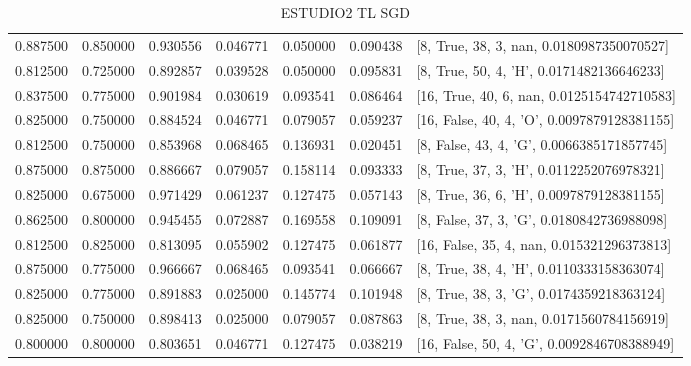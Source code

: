 \begin{table}[!htb]
{\begin{tabular}{cccc}
0.887500 & 0.850000 & 0.930556 & 0.046771 & 0.050000 & 0.090438 & [8, True, 38, 3, nan, 0.0180987350070527] \\
0.812500 & 0.725000 & 0.892857 & 0.039528 & 0.050000 & 0.095831 & [8, True, 50, 4, 'H', 0.0171482136646233] \\
0.837500 & 0.775000 & 0.901984 & 0.030619 & 0.093541 & 0.086464 & [16, True, 40, 6, nan, 0.0125154742710583] \\
0.825000 & 0.750000 & 0.884524 & 0.046771 & 0.079057 & 0.059237 & [16, False, 40, 4, 'O', 0.0097879128381155] \\
0.812500 & 0.750000 & 0.853968 & 0.068465 & 0.136931 & 0.020451 & [8, False, 43, 4, 'G', 0.0066385171857745] \\
0.875000 & 0.875000 & 0.886667 & 0.079057 & 0.158114 & 0.093333 & [8, True, 37, 3, 'H', 0.0112252076978321] \\
0.825000 & 0.675000 & 0.971429 & 0.061237 & 0.127475 & 0.057143 & [8, True, 36, 6, 'H', 0.0097879128381155] \\
0.862500 & 0.800000 & 0.945455 & 0.072887 & 0.169558 & 0.109091 & [8, False, 37, 3, 'G', 0.0180842736988098] \\
0.812500 & 0.825000 & 0.813095 & 0.055902 & 0.127475 & 0.061877 & [16, False, 35, 4, nan, 0.015321296373813] \\
0.875000 & 0.775000 & 0.966667 & 0.068465 & 0.093541 & 0.066667 & [8, True, 38, 4, 'H', 0.0110333158363074] \\
0.825000 & 0.775000 & 0.891883 & 0.025000 & 0.145774 & 0.101948 & [8, True, 38, 3, 'G', 0.0174359218363124] \\
0.825000 & 0.750000 & 0.898413 & 0.025000 & 0.079057 & 0.087863 & [8, True, 38, 3, nan, 0.0171560784156919] \\
0.800000 & 0.800000 & 0.803651 & 0.046771 & 0.127475 & 0.038219 & [16, False, 50, 4, 'G', 0.0092846708388949] \\
\bottomrule
\end{tabular}
}
\caption{ESTUDIO2 TL SGD}
\label{tab:estudio2_tl_sgd}
\end{table}
